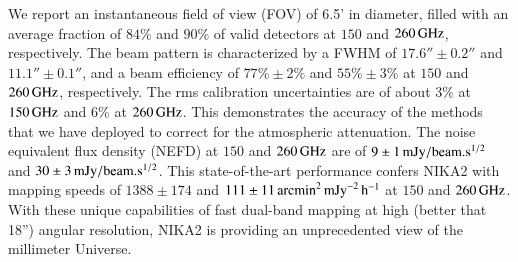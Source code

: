 \documentclass[traditionalabstract]{aa}
\begin{document}
       {We report an instantaneous field of view (FOV) of 6.5'
         in diameter, filled with an average fraction of $84\%$ and 
         $90\%$ of %
         valid detectors
         at $150$ and $260\,\rm{GHz}$, respectively. The beam pattern
         is characterized by a FWHM of $17.6'' \pm 0.2''$
         and  $11.1''\pm 0.1''$, and a beam efficiency of
         $77\% \pm 2\%$ and $55\% \pm 3\%$
         at $150$ and $260\,\rm{GHz}$, respectively.
         The rms calibration uncertainties are of about $3\%$ at $150\,\rm{GHz}$ 
         and $6\%$ at $260\,\rm{GHz}$. This demonstrates
         the accuracy of the methods that we have deployed to correct
         for the atmospheric attenuation. The noise equivalent
         flux density (NEFD) at $150$ and $260\,\rm{GHz}$ are of
         $9 \pm 1\, \rm{mJy}/{beam}.s^{1/2}$ and
         $30 \pm 3\, \rm{mJy}/{beam}.s^{1/2}$. 
         This state-of-the-art performance confers NIKA2 with
         mapping speeds of $1388 \pm 174$ and
         $111 \pm 11 \, \rm{arcmin}^2\, \rm{mJy}^{-2}\,\rm{h}^{-1}$
         at $150$ and $260\,\rm{GHz}$.}
       {With these unique capabilities of fast dual-band mapping at
         high (better that 18'') angular resolution, NIKA2 is providing an unprecedented view
         of the millimeter Universe.}
       
       
   \maketitle

   
\end{document}
